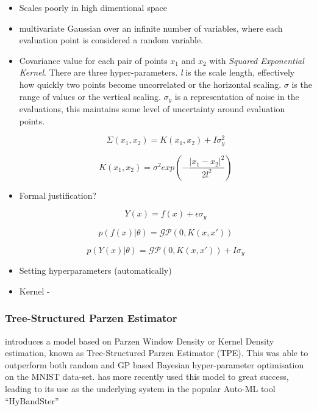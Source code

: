 \documentclass{article}
\begin{document}
		\begin{itemize}


		\item Scales poorly in high dimentional space

		\item multivariate Gaussian over an infinite number of variables, where each evaluation point is considered a random variable. 



		\item Covariance value for each pair of points \(x_1\)  and  \(x_2\) with \textit{Squared Exponential Kernel}. There are three hyper-parameters. \textit{l} is the scale length, effectively how quickly two points become uncorrelated or the horizontal scaling. \(\sigma\) is the range of values or the vertical scaling. \(\sigma_y\) is a representation of noise in the evaluations, this maintains some level of uncertainty around evaluation points.

		 \[\Sigma(x_1,x_2) = K(x_1,x_2) + I\sigma_y^2\]

		 \[K(x_1,x_2) = \sigma^2 exp\left(-\frac{\mathopen|x_1 - x_2\mathclose|^2}{2l^2}\right)\]

		\item Formal justification?

		\[ Y(x) = f(x) + \epsilon \sigma_y\]

		\[ p(f(x)|\theta) = \mathcal{GP}(0,K(x,x'))\]

		\[ p(Y(x)|\theta) = \mathcal{GP}(0,K(x,x')) + I\sigma_y\]

		\item Setting hyperparameters (automatically)

		\item Kernel -

		\begin{itemize}




		\end{itemize}

		\end{itemize}



		\subsubsection{Tree-Structured Parzen Estimator}

			\cite{20} introduces a model based on Parzen Window Density or Kernel Density estimation, known as Tree-Structured Parzen Estimator (TPE). This was able to outperform both random and GP based Bayesian hyper-parameter optimisation on the MNIST data-set. \cite{32} has more recently used this model to great success, leading to its use as the underlying system in the popular Auto-ML tool “HyBandSter” \cite{34}
\end{document}
